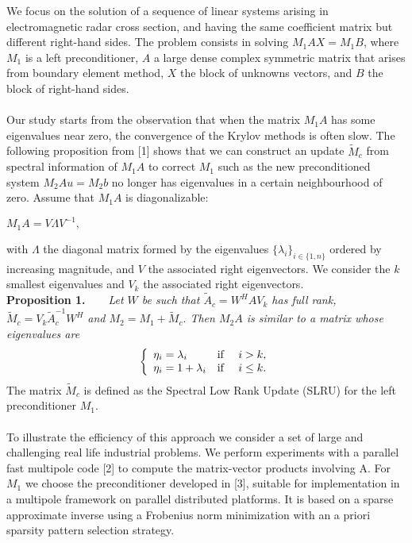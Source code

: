 \documentclass{report}
\begin{document}
We focus on the solution of a sequence of linear systems arising in
electromagnetic radar cross section, and having the same
coefficient matrix but different right-hand sides.
The problem consists in solving $M_{1}AX=M_{1}B$, where $M_{1}$ is a left
preconditioner, $A$ a large dense complex symmetric matrix that arises
from boundary element method, $X$ the block of unknowns vectors, and $B$
the block of right-hand sides.\\
\\
Our study starts from the observation that when the matrix $M_{1}A$ has
some eigenvalues near zero, the convergence
of the Krylov methods is often slow. The following proposition from [1]
shows that we can construct an update ${\tilde{M}}_c$ from spectral
information of $M_1A$ to correct $M_1$ such as the new preconditioned
system $M_{2}Au = M_{2}b$ no longer has eigenvalues in a certain
neighbourhood of zero.
Assume that $M_1A$ is diagonalizable:
\begin{center}
$M_1A = V\Lambda V^{-1},$
\end{center}
with $\Lambda$ the diagonal matrix formed by the eigenvalues
${\{\lambda_i\}}_{i\in\{1,n\}}$ ordered by increasing magnitude, and
$V$ the associated right eigenvectors. We consider the $k$ smallest
eigenvalues and $V_k$ the associated right eigenvectors.\\
{\bf Proposition 1.~~~}
{\it Let $W$ be such that
$\tilde{A}_c = W^H A V_k $ has full rank,
$ {\tilde{M}}_c = V_k \tilde{A}_c^{-1} W^{H} $ and
$ M_2 = M_1 + {\tilde{M}}_c.$
Then $M_{2}A$ is similar to a matrix whose eigenvalues are
$$
\left \{
\begin{array}{l l l}
\eta_i = \lambda_i & \mbox{\rm if } & i > k , \\
\eta_i = 1 + \lambda_i & \mbox{\rm if } & i \leq k . \\
\end{array}
\right .
$$
}
The matrix ${\tilde{M}}_c$ is defined as the Spectral Low Rank Update
(SLRU) for the left preconditioner $M_1$.\\
\\
To illustrate the efficiency of this approach we consider a set of large
and challenging real life industrial problems.
We perform experiments with a parallel fast multipole code [2] to compute
the matrix-vector products involving A.
For $M_1$ we choose the preconditioner developed in [3], suitable for
implementation in a multipole framework on parallel distributed
platforms.
It is based on a sparse approximate inverse using a Frobenius norm
minimization with an a priori sparsity pattern selection strategy.
\end{document}
